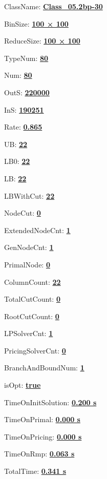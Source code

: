 \documentclass[11pt]{article}
\begin{document}
\pagestyle{empty}


ClassName: \underline{\textbf{Class_05.2bp-30}}
\par
BinSize: \underline{\textbf{100 × 100}}
\par
ReduceSize: \underline{\textbf{100 × 100}}
\par
TypeNum: \underline{\textbf{80}}
\par
Num: \underline{\textbf{80}}
\par
OutS: \underline{\textbf{220000}}
\par
InS: \underline{\textbf{190251}}
\par
Rate: \underline{\textbf{0.865}}
\par
UB: \underline{\textbf{22}}
\par
LB0: \underline{\textbf{22}}
\par
LB: \underline{\textbf{22}}
\par
LBWithCut: \underline{\textbf{22}}
\par
NodeCut: \underline{\textbf{0}}
\par
ExtendedNodeCnt: \underline{\textbf{1}}
\par
GenNodeCnt: \underline{\textbf{1}}
\par
PrimalNode: \underline{\textbf{0}}
\par
ColumnCount: \underline{\textbf{22}}
\par
TotalCutCount: \underline{\textbf{0}}
\par
RootCutCount: \underline{\textbf{0}}
\par
LPSolverCnt: \underline{\textbf{1}}
\par
PricingSolverCnt: \underline{\textbf{0}}
\par
BranchAndBoundNum: \underline{\textbf{1}}
\par
isOpt: \underline{\textbf{true}}
\par
TimeOnInitSolution: \underline{\textbf{0.200 s}}
\par
TimeOnPrimal: \underline{\textbf{0.000 s}}
\par
TimeOnPricing: \underline{\textbf{0.000 s}}
\par
TimeOnRmp: \underline{\textbf{0.063 s}}
\par
TotalTime: \underline{\textbf{0.341 s}}
\par
\newpage


\end{document}
